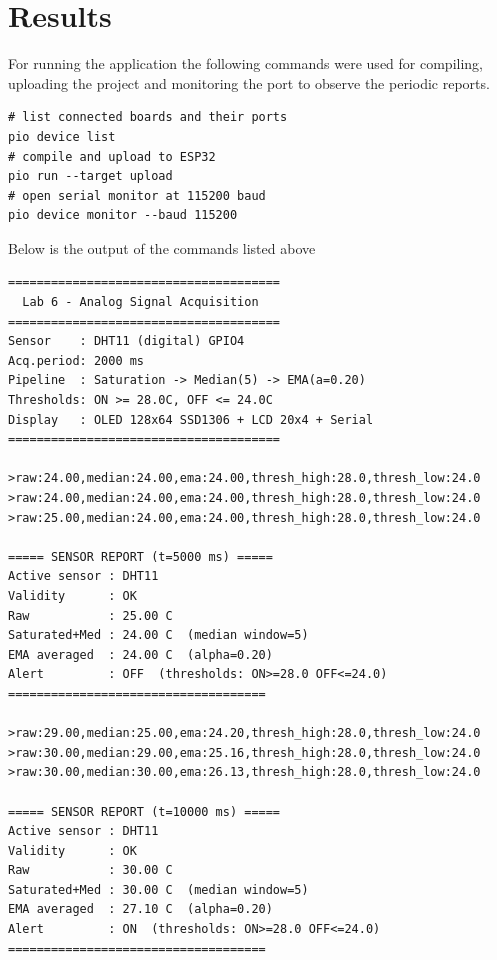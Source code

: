 \section{Results}

For running the application the following commands were used for compiling,
uploading the project and monitoring the port to observe the periodic reports.

\begin{verbatim}
# list connected boards and their ports
pio device list
# compile and upload to ESP32
pio run --target upload
# open serial monitor at 115200 baud
pio device monitor --baud 115200
\end{verbatim}

Below is the output of the commands listed above

\begin{verbatim}
======================================
  Lab 6 - Analog Signal Acquisition
======================================
Sensor    : DHT11 (digital) GPIO4
Acq.period: 2000 ms
Pipeline  : Saturation -> Median(5) -> EMA(a=0.20)
Thresholds: ON >= 28.0C, OFF <= 24.0C
Display   : OLED 128x64 SSD1306 + LCD 20x4 + Serial
======================================

>raw:24.00,median:24.00,ema:24.00,thresh_high:28.0,thresh_low:24.0
>raw:24.00,median:24.00,ema:24.00,thresh_high:28.0,thresh_low:24.0
>raw:25.00,median:24.00,ema:24.00,thresh_high:28.0,thresh_low:24.0

===== SENSOR REPORT (t=5000 ms) =====
Active sensor : DHT11
Validity      : OK
Raw           : 25.00 C
Saturated+Med : 24.00 C  (median window=5)
EMA averaged  : 24.00 C  (alpha=0.20)
Alert         : OFF  (thresholds: ON>=28.0 OFF<=24.0)
====================================

>raw:29.00,median:25.00,ema:24.20,thresh_high:28.0,thresh_low:24.0
>raw:30.00,median:29.00,ema:25.16,thresh_high:28.0,thresh_low:24.0
>raw:30.00,median:30.00,ema:26.13,thresh_high:28.0,thresh_low:24.0

===== SENSOR REPORT (t=10000 ms) =====
Active sensor : DHT11
Validity      : OK
Raw           : 30.00 C
Saturated+Med : 30.00 C  (median window=5)
EMA averaged  : 27.10 C  (alpha=0.20)
Alert         : ON  (thresholds: ON>=28.0 OFF<=24.0)
====================================
\end{verbatim}

